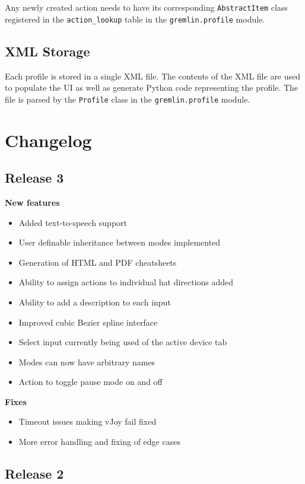 \documentclass[a4, 10pt]{article}
\begin{document}
Any newly created action needs to have its corresponding
\verb+AbstractItem+ class registered in the \verb+action_lookup+ table
in the \verb+gremlin.profile+ module.


\subsection{XML Storage}

Each profile is stored in a single XML file. The contents of the XML
file are used to populate the UI as well as generate Python code
representing the profile. The file is parsed by the \verb+Profile+ class
in the \verb+gremlin.profile+ module.



\section{Changelog}

\subsection{Release 3}

\textbf{New features}
\begin{itemize}
    \item Added text-to-speech support
    \item User definable inheritance between modes implemented
    \item Generation of HTML and PDF cheatsheets
    \item Ability to assign actions to individual hat directions added
    \item Ability to add a description to each input
    \item Improved cubic Bezier spline interface
    \item Select input currently being used of the active device tab
    \item Modes can now have arbitrary names
    \item Action to toggle pause mode on and off
\end{itemize}

\textbf{Fixes}
\begin{itemize}
    \item Timeout issues making vJoy fail fixed
    \item More error handling and fixing of edge cases
\end{itemize}


\subsection{Release 2}
\end{document}
